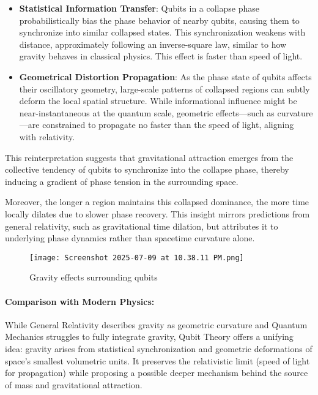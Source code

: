 \documentclass[12pt]{report} %
\begin{document}
\begin{itemize}
  \item \textbf{Statistical Information Transfer}: Qubits in a collapse phase probabilistically bias the phase behavior of nearby qubits, causing them to synchronize into similar collapsed states. This synchronization weakens with distance, approximately following an inverse-square law, similar to how gravity behaves in classical physics. This effect is faster than speed of light.
  
  \item \textbf{Geometrical Distortion Propagation}: As the phase state of qubits affects their oscillatory geometry, large-scale patterns of collapsed regions can subtly deform the local spatial structure. While informational influence might be near-instantaneous at the quantum scale, geometric effects—such as curvature—are constrained to propagate no faster than the speed of light, aligning with relativity.
\end{itemize}

This reinterpretation suggests that gravitational attraction emerges from the collective tendency of qubits to synchronize into the collapse phase, thereby inducing a gradient of phase tension in the surrounding space. 

Moreover, the longer a region maintains this collapsed dominance, the more time locally dilates due to slower phase recovery. This insight mirrors predictions from general relativity, such as gravitational time dilation, but attributes it to underlying phase dynamics rather than spacetime curvature alone.
\begin{figure}
    \centering
    \texttt{[image: Screenshot 2025-07-09 at 10.38.11 PM.png]}
    \caption{Gravity effects surrounding qubits}
    \label{fig:enter-label}
\end{figure}

\paragraph{Comparison with Modern Physics:} 
While General Relativity describes gravity as geometric curvature and Quantum Mechanics struggles to fully integrate gravity, Qubit Theory offers a unifying idea: gravity arises from statistical synchronization and geometric deformations of space's smallest volumetric units. It preserves the relativistic limit (speed of light for propagation) while proposing a possible deeper mechanism behind the source of mass and gravitational attraction.
\end{document}
